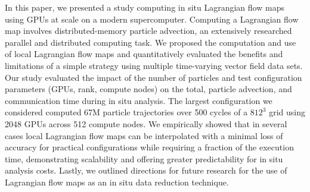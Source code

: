 In this paper, we presented a study computing in situ Lagrangian flow maps using GPUs at scale on a modern supercomputer.
%
Computing a Lagrangian flow map involves distributed-memory particle advection, an extensively researched parallel and distributed computing task.
%
We proposed the computation and use of local Lagrangian flow maps and quantitatively evaluated the benefits and limitations of a simple strategy using multiple time-varying vector field data sets.
%
Our study evaluated the impact of the number of particles and test configuration parameters (GPUs, rank, compute nodes) on the total, particle advection, and communication time during in situ analysis.
%
The largest configuration we considered computed 67M particle trajectories over 500 cycles of a $812^{3}$ grid using 2048 GPUs across 512 compute nodes.
%
We empirically showed that in several cases local Lagrangian flow maps can be interpolated with a minimal loss of accuracy for practical configurations while requiring a fraction of the execution time, demonstrating scalability and offering greater predictability for in situ analysis costs.
%
Lastly, we outlined directions for future research for the use of Lagrangian flow maps as an in situ data reduction technique.
